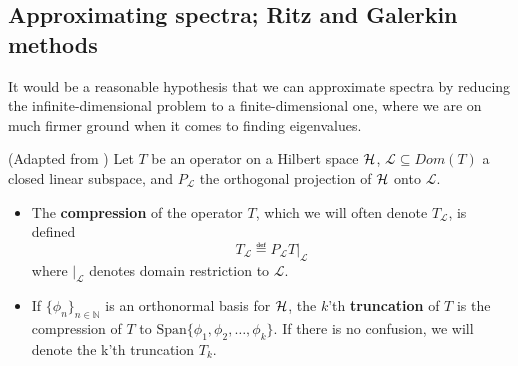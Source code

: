 \documentclass[../main.tex]{subfiles}
\begin{document}
\subsection{Approximating spectra; Ritz and Galerkin methods}

It would be a reasonable hypothesis that we can approximate spectra by reducing
the infinite-dimensional problem to a finite-dimensional one, where we are on
much firmer ground when it comes to finding eigenvalues.

\begin{definition}
(Adapted from \parencite{davies1995spectral})
  Let $T$ be an operator on a Hilbert space $\mathcal{H}$, $\mathcal{L} \subseteq
  Dom(T)$ a closed linear subspace, and $P_\mathcal{L}$ the orthogonal
  projection of $\mathcal{H}$ onto $\mathcal{L}$.
  \begin{itemize}
  \item The \textbf{compression} of the operator $T$, which we will often denote
    $T_\mathcal{L}$, is defined 
      $$T_\mathcal{L} \eqdef P_\mathcal{L} T\big|_{\mathcal{L}}$$
    where $\big|_{\mathcal{L}}$ denotes domain restriction to $\mathcal{L}$. 
  \item If $\{\phi_n\}_{n \in \mathbb{N}}$ is an orthonormal basis
    for $\mathcal{H}$, the $k$'th \textbf{truncation} of $T$ is the compression
    of $T$ to $\text{Span}\{\phi_1, \phi_2, \hdots, \phi_k\}$. If
    there is no confusion, we will denote the k'th truncation $T_k$.
  \end{itemize}
\end{definition}
\end{document}
